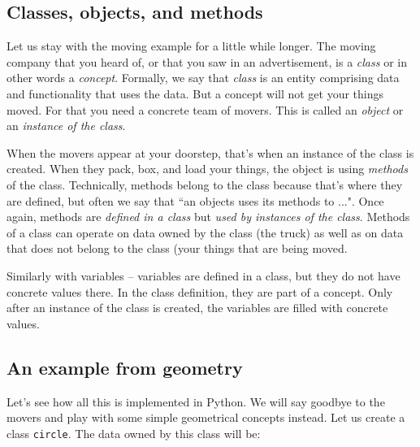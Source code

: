 \documentclass[article,A4,12pt]{llncs}
\begin{document}
\subsection{Classes, objects, and methods}

Let us stay with the moving example for a little while longer. The moving 
company that you heard of, or that you saw in an advertisement, 
is a {\em class} or in other words a {\em concept}. Formally, we say that 
{\em class} is an entity comprising data and functionality that uses the data.
But a concept will not get your things moved. For that you need a concrete team of 
movers. This is called an {\em object} or an {\em instance of the class}. 

When the movers appear at your doorstep, that's when an instance 
of the class is created. When they pack, box, and load your things, the object is using 
{\em methods} of the class. Technically, methods belong to the class because that's
where they are defined, but often we say that ``an objects uses its methods to ...". 
Once again, methods are {\em defined in a class} but {\em used 
by instances of the class}. 
Methods of a class can operate on data owned by the class (the truck) as well as 
on data that does not belong to the class (your things that are being moved.

Similarly with variables -- variables are defined in a class, but they do not 
have concrete values there. In the class definition, they are part of a concept. 
Only after an instance of the class is created, the variables are filled with 
concrete values. 

\subsection{An example from geometry}

Let's see how all this is implemented in Python. We will say goodbye to the movers
and play with some simple geometrical concepts instead. Let us create a class
{\tt circle}. The data owned by this class will be:
\end{document}

